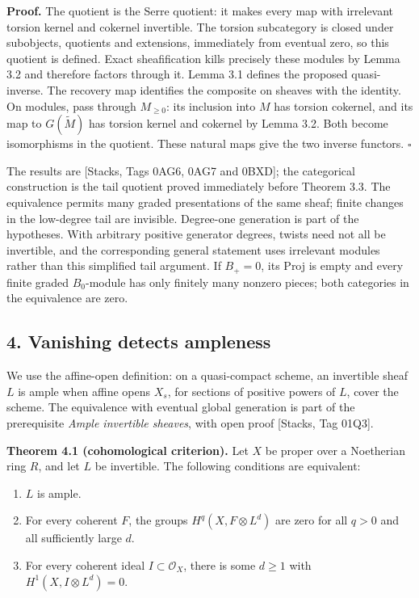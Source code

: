 \documentclass[11pt]{article}
\providecommand{\tightlist}{\setlength{\itemsep}{0pt}\setlength{\parskip}{0pt}}
\begin{document}
\textbf{Proof.} The quotient is the Serre quotient: it makes every map
with irrelevant torsion kernel and cokernel invertible. The torsion
subcategory is closed under subobjects, quotients and extensions,
immediately from eventual zero, so this quotient is defined. Exact
sheafification kills precisely these modules by Lemma 3.2 and therefore
factors through it. Lemma 3.1 defines the proposed quasi-inverse. The
recovery map identifies the composite on sheaves with the identity. On
modules, pass through \(M_{\ge0}\): its inclusion into \(M\) has torsion
cokernel, and its map to \(G(\widetilde M)\) has torsion kernel and
cokernel by Lemma 3.2. Both become isomorphisms in the quotient. These
natural maps give the two inverse functors. \(\square\)

The results are {[}Stacks, Tags 0AG6, 0AG7 and 0BXD{]}; the categorical
construction is the tail quotient proved immediately before Theorem 3.3.
The equivalence permits many graded presentations of the same sheaf;
finite changes in the low-degree tail are invisible. Degree-one
generation is part of the hypotheses. With arbitrary positive generator
degrees, twists need not all be invertible, and the corresponding
general statement uses irrelevant modules rather than this simplified
tail argument. If \(B_+=0\), its Proj is empty and every finite graded
\(B_0\)-module has only finitely many nonzero pieces; both categories in
the equivalence are zero.

\subsection{4. Vanishing detects
ampleness}\label{vanishing-detects-ampleness}

We use the affine-open definition: on a quasi-compact scheme, an
invertible sheaf \(L\) is ample when affine opens \(X_s\), for sections
of positive powers of \(L\), cover the scheme. The equivalence with
eventual global generation is part of the prerequisite \emph{Ample
invertible sheaves}, with open proof {[}Stacks, Tag 01Q3{]}.

\textbf{Theorem 4.1 (cohomological criterion).} Let \(X\) be proper over
a Noetherian ring \(R\), and let \(L\) be invertible. The following
conditions are equivalent:

\begin{enumerate}
\def\labelenumi{\arabic{enumi}.}
\tightlist
\item
  \(L\) is ample.
\item
  For every coherent \(F\), the groups \(H^q(X,F\otimes L^d)\) are zero
  for all \(q>0\) and all sufficiently large \(d\).
\item
  For every coherent ideal \(I\subset\mathcal O_X\), there is some
  \(d\ge1\) with \(H^1(X,I\otimes L^d)=0\).
\end{enumerate}
\end{document}
